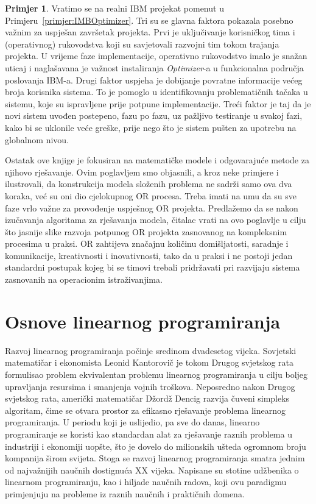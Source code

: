 \documentclass[b5paper, utf8, 11pt, colorlinks]{book}
\theoremstyle{definition}
\newtheorem{primjer}{Primjer}[chapter]
\begin{document}
 \begin{primjer} Vratimo se na realni  IBM projekat pomenut u Primjeru~\ref{primjer:IMBOptimizer}.  Tri su se glavna faktora pokazala posebno važnim za uspješan završetak projekta. Prvi je   uključivanje korisničkog tima i (operativnog) rukovodstva koji su savjetovali razvojni tim tokom trajanja   projekta. U vrijeme faze implementacije, operativno rukovodstvo imalo je snažan  uticaj i naglašavana je važnost instaliranja \emph{Optimizer}-a u  funkcionalna područja poslovanja IBM-a. Drugi faktor uspjeha je dobijanje povratne informacije  većeg broja korisnika sistema. To je pomoglo u identifikovanju problematičnih tačaka u sistemu, koje su ispravljene prije potpune implementacije. 
 Treći faktor je taj da je novi sistem  uvođen postepeno, fazu po fazu, uz pažljivo testiranje u svakoj fazi, kako bi se uklonile veće greške, prije nego što  je sistem   pušten za upotrebu na  globalnom nivou.  
 \end{primjer}
 \vspace{0.5cm}

 Ostatak ove knjige je fokusiran na  matematičke modele i odgovarajuće metode za njihovo rješavanje. Ovim poglavljem smo objasnili, a kroz neke primjere i ilustrovali, da konstrukcija modela složenih problema ne sadrži samo ova dva koraka, već su oni  dio cjelokupnog OR procesa. Treba imati na umu da su sve faze vrlo važne za provođenje uspješnog OR projekta. Predlažemo da se nakon izučavanja algoritama za rješavanja modela, čitalac vrati na ovo poglavlje u cilju što jasnije slike razvoja potpunog OR projekta zasnovanog na kompleksnim procesima u praksi.  OR zahtijeva značajnu količinu domišljatosti, saradnje i komunikacije, kreativnosti i inovativnosti, tako da u praksi i ne postoji jedan standardni postupak kojeg bi se timovi trebali pridržavati pri razvijaju sistema zasnovanih na operacionim istraživanjima. %

 \chapter{Osnove linearnog programiranja} \label{chp:lp}
  
   Razvoj linearnog programiranja počinje sredinom dvadesetog vijeka. Sovjetski matematičar i ekonomista Leonid Kantorovič je tokom Drugog svjetskog rata formulisao problem ekvivalentan problemu linearnog programiranja u cilju boljeg upravljanja resursima i smanjenja vojnih troškova. Neposredno nakon Drugog svjetskog rata, američki matematičar Džordž Dencig razvija čuveni simpleks algoritam, čime se otvara prostor za efikasno rješavanje problema linearnog programiranja. U periodu koji je uslijedio, pa sve do danas, linearno programiranje se koristi kao standardan alat za rješavanje raznih problema u industriji i ekonomiji uopšte, što je dovelo do   milionskih ušteda ogromnom broju kompanija širom svijeta. Stoga se razvoj linearnog programiranja  smatra jednim od najvažnijih naučnih dostignu\-ća XX vijeka.  Napisane su stotine udžbenika o linearnom programiranju, kao i hiljade naučnih radova, koji ovu paradigmu primjenjuju na probleme iz raznih naučnih i praktičnih domena. 
\end{document}
